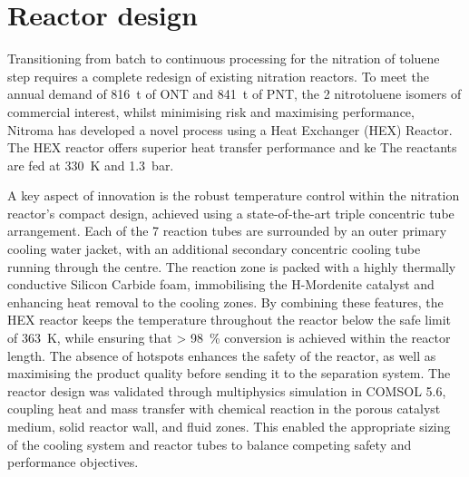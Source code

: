 \section*{Reactor design}
Transitioning from batch to continuous processing for the nitration of toluene step requires a complete redesign of existing nitration reactors. To meet the annual demand of \SI{816}{\tonne} of ONT and \SI{841}{\tonne} of PNT, the 2 nitrotoluene isomers of commercial interest, whilst minimising risk and maximising performance, Nitroma has developed a novel process using a Heat Exchanger (HEX) Reactor. The HEX reactor offers superior heat transfer performance and ke The reactants are fed at \SI{330}{\K} and \SI{1.3}{bar}.

A key aspect of innovation is the robust temperature control within the nitration reactor's compact design, achieved using a state-of-the-art triple concentric tube arrangement. Each of the 7 reaction tubes are surrounded by an outer primary cooling water jacket, with an additional secondary concentric cooling tube running through the centre. The reaction zone is packed with a highly thermally conductive Silicon Carbide foam, immobilising the H-Mordenite catalyst and enhancing heat removal to the cooling zones. By combining these features, the HEX reactor keeps the temperature throughout the reactor below the safe limit of \SI{363}{\K}, while ensuring that \SI{> 98}{\percent} conversion is achieved within the reactor length. The absence of hotspots enhances the safety of the reactor, as well as maximising the product quality before sending it to the separation system. The reactor design was validated through multiphysics simulation in COMSOL 5.6, coupling heat and mass transfer with chemical reaction in the porous catalyst medium, solid reactor wall, and fluid zones. This enabled the appropriate sizing of the cooling system and reactor tubes to balance competing safety and performance objectives.

